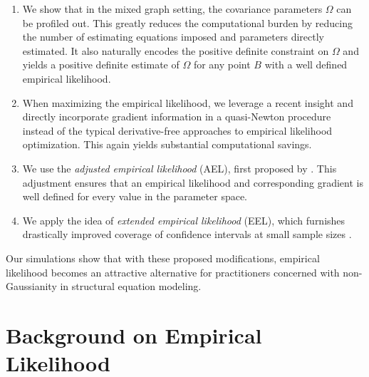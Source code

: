 \documentclass[notitlepage]{article}
\begin{document}
\begin{enumerate}[label=(\roman*)]
\item We show that in the mixed graph setting, the
covariance parameters $\Omega$ can be profiled out. This greatly
reduces the computational burden by reducing the number of estimating
equations imposed and parameters directly estimated. It also naturally
encodes the positive definite constraint on $\Omega$ and yields a
positive definite estimate of $\Omega$ for any point $B$ with a well
defined empirical likelihood.
\item When maximizing the empirical
likelihood, we leverage a recent insight and directly incorporate
gradient information in a quasi-Newton procedure instead of the
typical derivative-free approaches to empirical likelihood
optimization.  This again yields substantial computational savings.
\item We use the \emph{adjusted empirical likelihood} (AEL),
  first proposed by \citet{chen2008adjusted}.  This adjustment ensures
  that an empirical likelihood and corresponding gradient is
  well defined for every value in the parameter space.
\item We apply the idea of \emph{extended empirical likelihood}
  (EEL), which furnishes drastically improved coverage of confidence
  intervals at small sample sizes \citep{tsao2014extended}.
\end{enumerate}
Our simulations show that with these proposed modifications, empirical
likelihood becomes an attractive alternative for practitioners
concerned with non-Gaussianity in structural equation modeling.

\section{Background on Empirical Likelihood} \label{sec:empLik}
\end{document}
